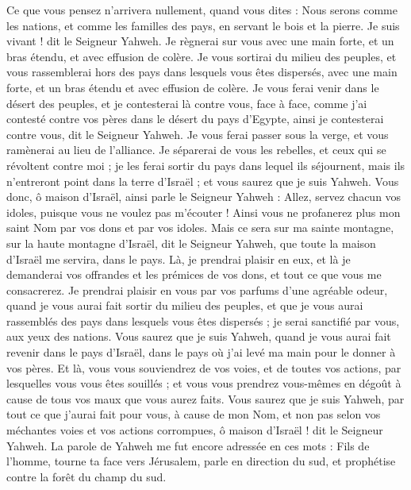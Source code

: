 \begin{multicols}{2}
Ce que vous pensez n'arrivera nullement, quand vous dites : Nous serons comme les nations, et comme les familles des pays, en servant le bois et la pierre.
Je suis vivant ! dit le Seigneur Yahweh. Je règnerai sur vous avec une main forte, et un bras étendu, et avec effusion de colère.
Je vous sortirai du milieu des peuples, et vous rassemblerai hors des pays dans lesquels vous êtes dispersés, avec une main forte, et un bras étendu et avec effusion de colère.
Je vous ferai venir dans le désert des peuples, et je contesterai là contre vous, face à face,
comme j'ai contesté contre vos pères dans le désert du pays d'Egypte, ainsi je contesterai contre vous, dit le Seigneur Yahweh.
Je vous ferai passer sous la verge, et vous ramènerai au lieu de l'alliance.
Je séparerai de vous les rebelles, et ceux qui se révoltent contre moi ; je les ferai sortir du pays dans lequel ils séjournent, mais ils n'entreront point dans la terre d'Israël ; et vous saurez que je suis Yahweh.
Vous donc, ô maison d'Israël, ainsi parle le Seigneur Yahweh : Allez, servez chacun vos idoles, puisque vous ne voulez pas m'écouter ! Ainsi vous ne profanerez plus mon saint Nom par vos dons et par vos idoles.
Mais ce sera sur ma sainte montagne, sur la haute montagne d'Israël, dit le Seigneur Yahweh, que toute la maison d'Israël me servira, dans le pays. Là, je prendrai plaisir en eux, et là je demanderai vos offrandes et les prémices de vos dons, et tout ce que vous me consacrerez.
Je prendrai plaisir en vous par vos parfums d'une agréable odeur, quand je vous aurai fait sortir du milieu des peuples, et que je vous aurai rassemblés des pays dans lesquels vous êtes dispersés ; je serai sanctifié par vous, aux yeux des nations.
Vous saurez que je suis Yahweh, quand je vous aurai fait revenir dans le pays d'Israël, dans le pays où j'ai levé ma main pour le donner à vos pères.
Et là, vous vous souviendrez de vos voies, et de toutes vos actions, par lesquelles vous vous êtes souillés ; et vous vous prendrez vous-mêmes en dégoût à cause de tous vos maux que vous aurez faits.
Vous saurez que je suis Yahweh, par tout ce que j'aurai fait pour vous, à cause de mon Nom, et non pas selon vos méchantes voies et vos actions corrompues, ô maison d'Israël ! dit le Seigneur Yahweh.
\VerseOne{}La parole de Yahweh me fut encore adressée en ces mots :
Fils de l'homme, tourne ta face vers Jérusalem, parle en direction du sud, et prophétise contre la forêt du champ du sud.

\end{multicols}

